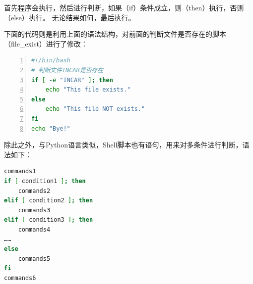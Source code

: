 首先程序会执行，然后进行判断，如果（if）条件成立，则（then）执行，否则（else）执行。 无论结果如何，最后执行。

下面的代码则是利用上面的语法结构，对前面的判断文件是否存在的脚本（file\_exist）进行了修改：

\begin{lstlisting}[language=bash,caption=file\_exist(2),numbers=left]
#!/bin/bash
# 判断文件INCAR是否存在
if [ -e "INCAR" ]; then
    echo "This file exists."
else
    echo "This file NOT exists."
fi
echo "Bye!"
\end{lstlisting}

除此之外，与Python语言类似，Shell脚本也有语句，用来对多条件进行判断，语法如下：

\begin{lstlisting}[language=bash]
commands1
if [ condition1 ]; then
    commands2
elif [ condition2 ]; then
    commands3
elif [ condition3 ]; then
    commands4
……
else
    commands5
fi
commands6
\end{lstlisting}

